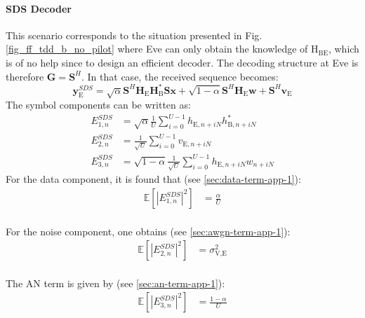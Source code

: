 \documentclass[journal,comsoc]{IEEEtran}
\newcommand{\EX}[1]{\mathbb{E} \left[#1\right]}%
\newcommand{\HE}{\textbf{H}_{\text{E}}}
\newcommand{\ve}{\textbf{v}_{\text{E}}}
\newcommand{\spread}{\textbf{S}}
\newcommand{\w}{\textbf{w}}
\newcommand{\mat}[1]{\boldsymbol{\mathrm{#1}}}
\begin{document}
\paragraph{SDS Decoder}
\label{sec:same-decoding-strucure-as-bob}
This scenario corresponds to the situation presented in Fig.\ref{fig_ff_tdd_b_no_pilot} where Eve can only obtain the knowledge of $\mat{H}_{\text{BE}}$, which is of no help since to design an efficient decoder. The decoding structure at Eve is therefore $\textbf{G}=\spread^H$. In that case, the received sequence becomes:
\begin{equation}
\textbf{y}_{\text{E}}^{SDS} = \sqrt{\alpha} \spread^H \HE \textbf{H}^*_{\text{B}} \spread\textbf{x} + \sqrt{1-\alpha} \spread^H \HE \w  +  \spread^H  \ve 
\label{eq:rx_eve_filt0}
\end{equation}
The symbol components can be written as:
\begin{equation}
\begin{split}
E_{1,n}^{SDS} &= \sqrt{\alpha}\frac{1}{U}\sum_{i=0}^{U-1}  h_{\text{E}, n + iN} h^*_{\text{B}, n + iN} \\
E_{2,n}^{SDS} &= \frac{1}{\sqrt{U}}\sum_{i=0}^{U-1}  v_{\text{E}, n + iN}\\
E_{3,n}^{SDS} &= \sqrt{1-\alpha}\frac{1}{\sqrt{U}}\sum_{i=0}^{U-1}  h_{\text{E}, n + iN}w_{n + iN}
\end{split}
\end{equation}
For the data component, it is found that (see \ref{sec:data-term-app-1}):
\begin{equation}
	\begin{split}
	\EX{|E_{1,n}^{SDS}|^2}&= \frac{\alpha}{U}
	\end{split}
	\label{eq:appA:data_eve_filt0}
\end{equation} \\
For the noise component, one obtains (see \ref{sec:awgn-term-app-1}):
\begin{equation}
	\begin{split}
	\EX{|E_{2,n}^{SDS}|^2} &=\sigma^2_{\text{V,E}}
	\end{split}
	\label{eq:appA:noise_eve_filt0}
\end{equation} \\
The AN term is given by (see \ref{sec:an-term-app-1}):
\begin{equation}
	\begin{split}
	\EX{|E_{3,n}^{SDS}|^2}  &= \frac{1-\alpha}{U}
	\end{split}
	\label{eq:appA:an_eve_filt0}
\end{equation}
\end{document}
